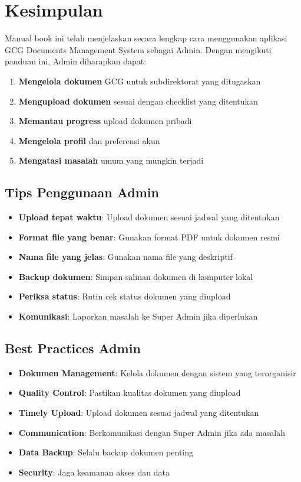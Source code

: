 \documentclass[12pt,a4paper]{article}
\begin{document}
\section{Kesimpulan}

Manual book ini telah menjelaskan secara lengkap cara menggunakan aplikasi GCG Documents Management System sebagai Admin. Dengan mengikuti panduan ini, Admin diharapkan dapat:

\begin{enumerate}
\item \textbf{Mengelola dokumen} GCG untuk subdirektorat yang ditugaskan
\item \textbf{Mengupload dokumen} sesuai dengan checklist yang ditentukan
\item \textbf{Memantau progress} upload dokumen pribadi
\item \textbf{Mengelola profil} dan preferensi akun
\item \textbf{Mengatasi masalah} umum yang mungkin terjadi
\end{enumerate}

\subsection{Tips Penggunaan Admin}
\begin{itemize}
\item \textbf{Upload tepat waktu}: Upload dokumen sesuai jadwal yang ditentukan
\item \textbf{Format file yang benar}: Gunakan format PDF untuk dokumen resmi
\item \textbf{Nama file yang jelas}: Gunakan nama file yang deskriptif
\item \textbf{Backup dokumen}: Simpan salinan dokumen di komputer lokal
\item \textbf{Periksa status}: Rutin cek status dokumen yang diupload
\item \textbf{Komunikasi}: Laporkan masalah ke Super Admin jika diperlukan
\end{itemize}

\subsection{Best Practices Admin}
\begin{itemize}
\item \textbf{Dokumen Management}: Kelola dokumen dengan sistem yang terorganisir
\item \textbf{Quality Control}: Pastikan kualitas dokumen yang diupload
\item \textbf{Timely Upload}: Upload dokumen sesuai jadwal yang ditentukan
\item \textbf{Communication}: Berkomunikasi dengan Super Admin jika ada masalah
\item \textbf{Data Backup}: Selalu backup dokumen penting
\item \textbf{Security}: Jaga keamanan akses dan data
\end{itemize}
\end{document}
